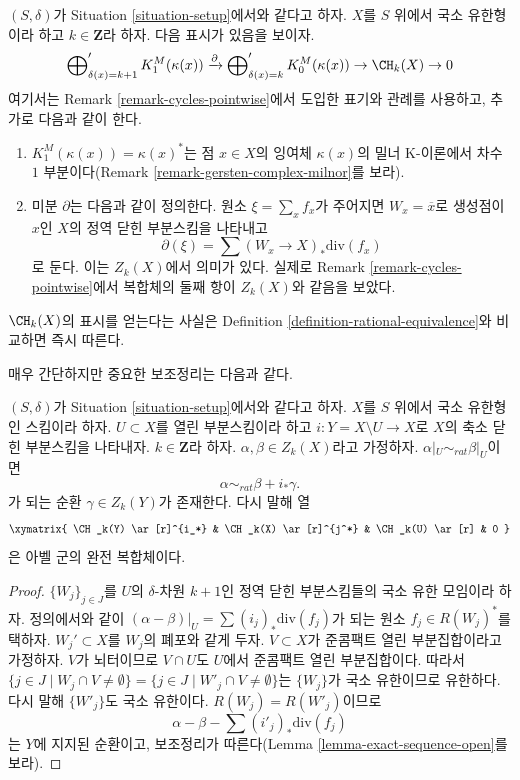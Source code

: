 \begin{remark}
\label{remark-chow-group-pointwise}
$(S, \delta)$가 Situation \ref{situation-setup}에서와 같다고 하자.
$X$를 $S$ 위에서 국소 유한형이라 하고 $k \in \mathbf{Z}$라 하자.
다음 표시가 있음을 보이자.
$$
\bigoplus\nolimits_{\delta(x) = k + 1}' K_1^M(\kappa(x))
\xrightarrow{\partial}
\bigoplus\nolimits_{\delta(x) = k}' K_0^M(\kappa(x)) \to
\CH_k(X) \to 0
$$
여기서는 Remark \ref{remark-cycles-pointwise}에서 도입한 표기와 관례를
사용하고, 추가로 다음과 같이 한다.
\begin{enumerate}
\item $K_1^M(\kappa(x)) = \kappa(x)^*$는 점 $x \in X$의 잉여체
$\kappa(x)$의 밀너 K-이론에서 차수 $1$ 부분이다(Remark
\ref{remark-gersten-complex-milnor}를 보라).
\item 미분 $\partial$는 다음과 같이 정의한다. 원소
$\xi = \sum_x f_x$가 주어지면 $W_x = \overline{x}$로 생성점이 $x$인
$X$의 정역 닫힌 부분스킴을 나타내고
$$
\partial(\xi) = \sum (W_x \to X)_*\text{div}(f_x)
$$
로 둔다. 이는 $Z_k(X)$에서 의미가 있다. 실제로 Remark
\ref{remark-cycles-pointwise}에서 복합체의 둘째 항이 $Z_k(X)$와
같음을 보았다.
\end{enumerate}
$\CH_k(X)$의 표시를 얻는다는 사실은 Definition
\ref{definition-rational-equivalence}와 비교하면 즉시 따른다.
\end{remark}

\noindent
매우 간단하지만 중요한 보조정리는 다음과 같다.

\begin{lemma}
\label{lemma-restrict-to-open}
$(S, \delta)$가 Situation \ref{situation-setup}에서와 같다고 하자.
$X$를 $S$ 위에서 국소 유한형인 스킴이라 하자. $U \subset X$를 열린
부분스킴이라 하고 $i : Y = X \setminus U \to X$로 $X$의 축소 닫힌
부분스킴을 나타내자. $k \in \mathbf{Z}$라 하자.
$\alpha, \beta \in Z_k(X)$라고 가정하자.
$\alpha|_U \sim_{rat} \beta|_U$이면
$$
\alpha \sim_{rat} \beta + i_*\gamma.
$$
가 되는 순환 $\gamma \in Z_k(Y)$가 존재한다. 다시 말해 열
$$
\xymatrix{
\CH_k(Y) \ar[r]^{i_*} & \CH_k(X) \ar[r]^{j^*} & \CH_k(U) \ar[r] & 0
}
$$
은 아벨 군의 완전 복합체이다.
\end{lemma}

\begin{proof}
$\{W_j\}_{j \in J}$를 $U$의 $\delta$-차원 $k + 1$인 정역 닫힌
부분스킴들의 국소 유한 모임이라 하자. 정의에서와 같이
$(\alpha - \beta)|_U = \sum (i_j)_*\text{div}(f_j)$가 되는 원소
$f_j \in R(W_j)^*$를 택하자. $W_j' \subset X$를 $W_j$의 폐포와 같게
두자. $V \subset X$가 준콤팩트 열린 부분집합이라고 가정하자.
$V$가 뇌터이므로 $V \cap U$도 $U$에서 준콤팩트 열린 부분집합이다.
따라서
$\{j \in J \mid W_j \cap V \not = \emptyset\}
= \{j \in J \mid W'_j \cap V \not = \emptyset\}$는 $\{W_j\}$가
국소 유한이므로 유한하다. 다시 말해 $\{W'_j\}$도 국소 유한이다.
$R(W_j) = R(W'_j)$이므로
$$
\alpha - \beta - \sum (i'_j)_*\text{div}(f_j)
$$
는 $Y$에 지지된 순환이고, 보조정리가 따른다(Lemma
\ref{lemma-exact-sequence-open}를 보라).
\end{proof}

